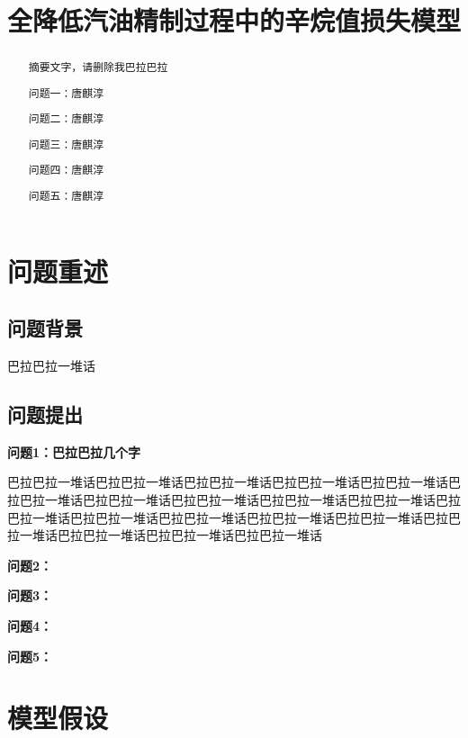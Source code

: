 \documentclass[bwprint]{gmcmthesis}
\title{全降低汽油精制过程中的辛烷值损失模型}
\begin{document}
 \maketitle


\begin{abstract}
摘要文字，请删除我巴拉巴拉


问题一：唐麒淳

问题二：唐麒淳

问题三：唐麒淳

问题四：唐麒淳

问题五：唐麒淳

\end{abstract}



\pagestyle{plain}


\tableofcontents
\newpage


\section{问题重述}
\subsection{问题背景}
巴拉巴拉一堆话
\subsection{问题提出}

\textbf{问题1：巴拉巴拉几个字}

巴拉巴拉一堆话巴拉巴拉一堆话巴拉巴拉一堆话巴拉巴拉一堆话巴拉巴拉一堆话巴拉巴拉一堆话巴拉巴拉一堆话巴拉巴拉一堆话巴拉巴拉一堆话巴拉巴拉一堆话巴拉巴拉一堆话巴拉巴拉一堆话巴拉巴拉一堆话巴拉巴拉一堆话巴拉巴拉一堆话巴拉巴拉一堆话巴拉巴拉一堆话巴拉巴拉一堆话巴拉巴拉一堆话


\textbf{问题2：}

\textbf{问题3：}

\textbf{问题4：}

\textbf{问题5：}


\section{模型假设}
\end{document}
